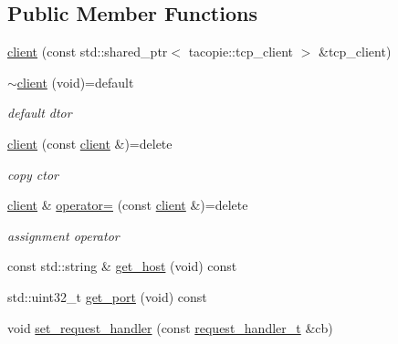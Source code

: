 \subsection*{Public Member Functions}
\begin{DoxyCompactItemize}
\item 
\hyperlink{classnetflex_1_1http_1_1client_a0b14a82f29bad24559d159f9459895a6}{client} (const std\+::shared\+\_\+ptr$<$ tacopie\+::tcp\+\_\+client $>$ \&tcp\+\_\+client)
\item 
\mbox{\label{classnetflex_1_1http_1_1client_ae940540532928329a06499f7ed8a4b7b}} 
\hyperlink{classnetflex_1_1http_1_1client_ae940540532928329a06499f7ed8a4b7b}{$\sim$client} (void)=default
\begin{DoxyCompactList}\small\item\em default dtor \end{DoxyCompactList}\item 
\mbox{\label{classnetflex_1_1http_1_1client_af13de483802dc1096a13870d9ecf5fa9}} 
\hyperlink{classnetflex_1_1http_1_1client_af13de483802dc1096a13870d9ecf5fa9}{client} (const \hyperlink{classnetflex_1_1http_1_1client}{client} \&)=delete
\begin{DoxyCompactList}\small\item\em copy ctor \end{DoxyCompactList}\item 
\mbox{\label{classnetflex_1_1http_1_1client_acc99fbf45017b7593e1c2851487ebb88}} 
\hyperlink{classnetflex_1_1http_1_1client}{client} \& \hyperlink{classnetflex_1_1http_1_1client_acc99fbf45017b7593e1c2851487ebb88}{operator=} (const \hyperlink{classnetflex_1_1http_1_1client}{client} \&)=delete
\begin{DoxyCompactList}\small\item\em assignment operator \end{DoxyCompactList}\item 
const std\+::string \& \hyperlink{classnetflex_1_1http_1_1client_a30d5d978725c09449266ea86e4dd130b}{get\+\_\+host} (void) const
\item 
std\+::uint32\+\_\+t \hyperlink{classnetflex_1_1http_1_1client_a9d64406a2b36fa59610798ee9abcf735}{get\+\_\+port} (void) const
\item 
void \hyperlink{classnetflex_1_1http_1_1client_a02ca4f8b6c166321e122fbb806b23ae2}{set\+\_\+request\+\_\+handler} (const \hyperlink{classnetflex_1_1http_1_1client_aeac22a78222d25d3224bf50b8e44fb2d}{request\+\_\+handler\+\_\+t} \&cb)

\end{DoxyCompactItemize}

